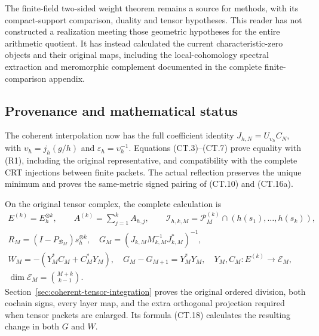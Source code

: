 The finite-field two-sided weight theorem remains a source for
methods, with its compact-support comparison, duality and
tensor hypotheses. This reader has not constructed a realization
meeting those geometric hypotheses for the entire arithmetic
quotient. It has instead calculated the current characteristic-zero
objects and their original maps, including the local-cohomology
spectral extraction and meromorphic complement documented in
the complete finite-comparison appendix.

\subsection{Provenance and mathematical status}
The coherent interpolation now has the full coefficient identity
\(J_{h,N}=U_{\upsilon_h}C_N\), with
\(\upsilon_h=j_h(g/h)\) and \(\varepsilon_h=\upsilon_h^{-1}\).
Equations (CT.3)--(CT.7) prove equality with (R1), including the
original representative, and compatibility with the complete CRT
injections between finite packets.  The actual reflection preserves
the unique minimum and proves the same-metric signed pairing of
(CT.10) and (CT.16a).

On the original tensor complex, the complete calculation is
\[
 \begin{gathered}
 E^{(k)}=E_h^{\otimes k},\qquad A^{(k)}=\sum_{j=1}^kA_{h,j},\qquad
 \mathcal I_{h,k,M}=\mathcal P_M^{(k)}
                     \cap(h(s_1),\ldots,h(s_k)),\\
 R_M=(I-P_{\mathcal B_M})s_h^{\otimes k},\quad
 G_M=(J_{k,M}M_{k,M}^{-1}J_{k,M}^*)^{-1},\\
 W_M=-(Y_M^*C_M+C_M^*Y_M),\quad
 G_M-G_{M+1}=Y_M^*Y_M,\quad
 Y_M,C_M:E^{(k)}\longrightarrow\mathcal E_M,\\
 \dim\mathcal E_M=\binom{M+k}{k-1}.
 \end{gathered}
 \tag{R5}
\]
Section~\ref{sec:coherent-tensor-integration} proves the original
ordered division, both cochain signs, every layer map, and the
extra orthogonal projection required when tensor packets are
enlarged.  Its formula (CT.18) calculates the resulting change in
both \(G\) and \(W\).

